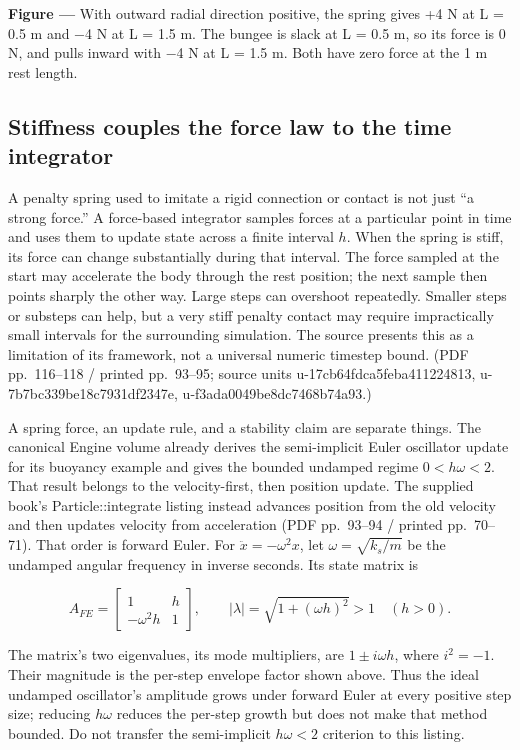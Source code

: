 \textbf{Figure ---} With outward radial direction positive, the spring gives +4 N at L = 0.5 m and −4 N at L = 1.5 m. The bungee is slack at L = 0.5 m, so its force is 0 N, and pulls inward with −4 N at L = 1.5 m. Both have zero force at the 1 m rest length.

\subsection{Stiffness couples the force law to the time integrator}\label{06-engine-ii-ch047-stiffness-couples-the-force-law-to-the-time-integrator}

A penalty spring used to imitate a rigid connection or contact is not just ``a strong force.'' A force-based integrator samples forces at a particular point in time and uses them to update state across a finite interval \(h\). When the spring is stiff, its force can change substantially during that interval. The force sampled at the start may accelerate the body through the rest position; the next sample then points sharply the other way. Large steps can overshoot repeatedly. Smaller steps or substeps can help, but a very stiff penalty contact may require impractically small intervals for the surrounding simulation. The source presents this as a limitation of its framework, not a universal numeric timestep bound. (PDF pp.~116--118 / printed pp.~93--95; source units u-17cb64fdca5feba411224813, u-7b7bc339be18c7931df2347e, u-f3ada0049be8dc7468b74a93.)

A spring force, an update rule, and a stability claim are separate things. The canonical Engine volume already derives the semi-implicit Euler oscillator update for its buoyancy example and gives the bounded undamped regime \(0<h\omega<2\). That result belongs to the velocity-first, then position update. The supplied book's Particle::integrate listing instead advances position from the old velocity and then updates velocity from acceleration (PDF pp.~93--94 / printed pp.~70--71). That order is forward Euler. For \(\ddot{x}=-\omega^2x\), let \(\omega=\sqrt{k_s/m}\) be the undamped angular frequency in inverse seconds. Its state matrix is

\[
A_{FE}=\begin{bmatrix}1&h\\-\omega^2h&1\end{bmatrix},
\qquad |\lambda|=\sqrt{1+(\omega h)^2}>1\quad(h>0).
\]

The matrix's two eigenvalues, its mode multipliers, are \(1\pm i\omega h\), where \(i^2=-1\). Their magnitude is the per-step envelope factor shown above. Thus the ideal undamped oscillator's amplitude grows under forward Euler at every positive step size; reducing \(h\omega\) reduces the per-step growth but does not make that method bounded. Do not transfer the semi-implicit \(h\omega<2\) criterion to this listing.

